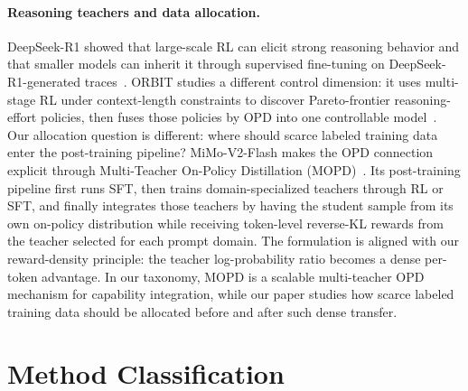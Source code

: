 \documentclass{article}
\begin{document}
\paragraph{Reasoning teachers and data allocation.} DeepSeek-R1 showed that large-scale RL can elicit strong reasoning behavior and that smaller models can inherit it through supervised fine-tuning on DeepSeek-R1-generated traces~\citep{deepseek2025r1}. ORBIT studies a different control dimension: it uses multi-stage RL under context-length constraints to discover Pareto-frontier reasoning-effort policies, then fuses those policies by OPD into one controllable model~\citep{liang2026orbit}. Our allocation question is different: where should scarce labeled training data enter the post-training pipeline? MiMo-V2-Flash makes the OPD connection explicit through Multi-Teacher On-Policy Distillation (MOPD)~\citep{xiaomi2026mimov2flash}. Its post-training pipeline first runs SFT, then trains domain-specialized teachers through RL or SFT, and finally integrates those teachers by having the student sample from its own on-policy distribution while receiving token-level reverse-KL rewards from the teacher selected for each prompt domain. The formulation is aligned with our reward-density principle: the teacher log-probability ratio becomes a dense per-token advantage. In our taxonomy, MOPD is a scalable multi-teacher OPD mechanism for capability integration, while our paper studies how scarce labeled training data should be allocated before and after such dense transfer.

\section{Method Classification}
\label{app:related-table}
\end{document}

